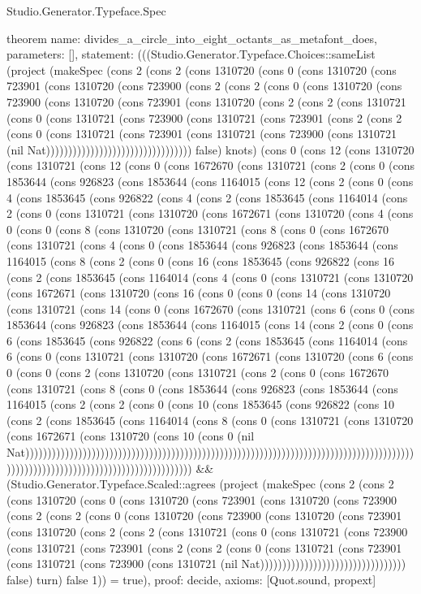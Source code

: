 \begin{lexlean}{Studio.Generator.Typeface.Spec}
\begin{semanticmodule}
theorem{
  name: divides_a_circle_into_eight_octants_as_metafont_does,
  parameters: [],
  statement: (((Studio.Generator.Typeface.Choices::sameList (project (makeSpec (cons 2 (cons 2 (cons 1310720 (cons 0 (cons 1310720 (cons 723901 (cons 1310720 (cons 723900 (cons 2 (cons 2 (cons 0 (cons 1310720 (cons 723900 (cons 1310720 (cons 723901 (cons 1310720 (cons 2 (cons 2 (cons 1310721 (cons 0 (cons 1310721 (cons 723900 (cons 1310721 (cons 723901 (cons 2 (cons 2 (cons 0 (cons 1310721 (cons 723901 (cons 1310721 (cons 723900 (cons 1310721 (nil Nat))))))))))))))))))))))))))))))))) false) knots) (cons 0 (cons 12 (cons 1310720 (cons 1310721 (cons 12 (cons 0 (cons 1672670 (cons 1310721 (cons 2 (cons 0 (cons 1853644 (cons 926823 (cons 1853644 (cons 1164015 (cons 12 (cons 2 (cons 0 (cons 4 (cons 1853645 (cons 926822 (cons 4 (cons 2 (cons 1853645 (cons 1164014 (cons 2 (cons 0 (cons 1310721 (cons 1310720 (cons 1672671 (cons 1310720 (cons 4 (cons 0 (cons 0 (cons 8 (cons 1310720 (cons 1310721 (cons 8 (cons 0 (cons 1672670 (cons 1310721 (cons 4 (cons 0 (cons 1853644 (cons 926823 (cons 1853644 (cons 1164015 (cons 8 (cons 2 (cons 0 (cons 16 (cons 1853645 (cons 926822 (cons 16 (cons 2 (cons 1853645 (cons 1164014 (cons 4 (cons 0 (cons 1310721 (cons 1310720 (cons 1672671 (cons 1310720 (cons 16 (cons 0 (cons 0 (cons 14 (cons 1310720 (cons 1310721 (cons 14 (cons 0 (cons 1672670 (cons 1310721 (cons 6 (cons 0 (cons 1853644 (cons 926823 (cons 1853644 (cons 1164015 (cons 14 (cons 2 (cons 0 (cons 6 (cons 1853645 (cons 926822 (cons 6 (cons 2 (cons 1853645 (cons 1164014 (cons 6 (cons 0 (cons 1310721 (cons 1310720 (cons 1672671 (cons 1310720 (cons 6 (cons 0 (cons 0 (cons 2 (cons 1310720 (cons 1310721 (cons 2 (cons 0 (cons 1672670 (cons 1310721 (cons 8 (cons 0 (cons 1853644 (cons 926823 (cons 1853644 (cons 1164015 (cons 2 (cons 2 (cons 0 (cons 10 (cons 1853645 (cons 926822 (cons 10 (cons 2 (cons 1853645 (cons 1164014 (cons 8 (cons 0 (cons 1310721 (cons 1310720 (cons 1672671 (cons 1310720 (cons 10 (cons 0 (nil Nat)))))))))))))))))))))))))))))))))))))))))))))))))))))))))))))))))))))))))))))))))))))))))))))))))))))))))))))))))))))))))))))))))) && (Studio.Generator.Typeface.Scaled::agrees (project (makeSpec (cons 2 (cons 2 (cons 1310720 (cons 0 (cons 1310720 (cons 723901 (cons 1310720 (cons 723900 (cons 2 (cons 2 (cons 0 (cons 1310720 (cons 723900 (cons 1310720 (cons 723901 (cons 1310720 (cons 2 (cons 2 (cons 1310721 (cons 0 (cons 1310721 (cons 723900 (cons 1310721 (cons 723901 (cons 2 (cons 2 (cons 0 (cons 1310721 (cons 723901 (cons 1310721 (cons 723900 (cons 1310721 (nil Nat))))))))))))))))))))))))))))))))) false) turn) false 1)) = true),
  proof: decide{},
  axioms: [Quot.sound, propext]
}


\end{semanticmodule}
\end{lexlean}
